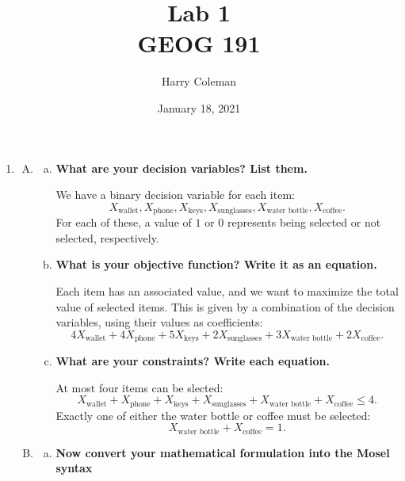 \documentclass[12pt]{article}
\title{Lab 1\\
    \large GEOG 191
}
\author{Harry Coleman}
\date{January 18, 2021}
\theoremstyle{definition}
\begin{document}
\maketitle

\begin{enumerate}[{Part} 1]
    \item 
    \begin{enumerate}[A.]
        \item
        \begin{enumerate}[a.]
            \item \textbf{What are your decision variables? List them.}
            
            We have a binary decision variable for each item:
            \[
                X_{\text{wallet}}, X_{\text{phone}}, X_{\text{keys}}, X_{\text{sunglasses}}, X_{\text{water bottle}}, X_{\text{coffee}}.
            \]
            For each of these, a value of $1$ or $0$ represents being selected or not selected, respectively.
            
            \item \textbf{What is your objective function? Write it as an equation.}
            
            Each item has an associated value, and we want to maximize the total value of selected items. This is given by a combination of the decision variables, using their values as coefficients:
            \[
                4X_{\text{wallet}} + 4X_{\text{phone}} + 5X_{\text{keys}} + 2X_{\text{sunglasses}} + 3X_{\text{water bottle}} + 2X_{\text{coffee}}.
            \]
            
            \item \textbf{What are your constraints? Write each equation.}
            
            At most four items can be slected:
            \[
                X_{\text{wallet}} + X_{\text{phone}} + X_{\text{keys}} + X_{\text{sunglasses}} + X_{\text{water bottle}} + X_{\text{coffee}} \leq 4.
            \]
            Exactly one of either the water bottle or coffee must be selected:
            \[
                X_{\text{water bottle}} + X_{\text{coffee}} = 1.
            \]
        \end{enumerate}
        
        \newpage
        \item 
        \begin{enumerate}[a.]
            \item \textbf{Now convert your mathematical formulation into the Mosel syntax}
            

\end{enumerate}
\end{enumerate}
\end{enumerate}
\end{document}
